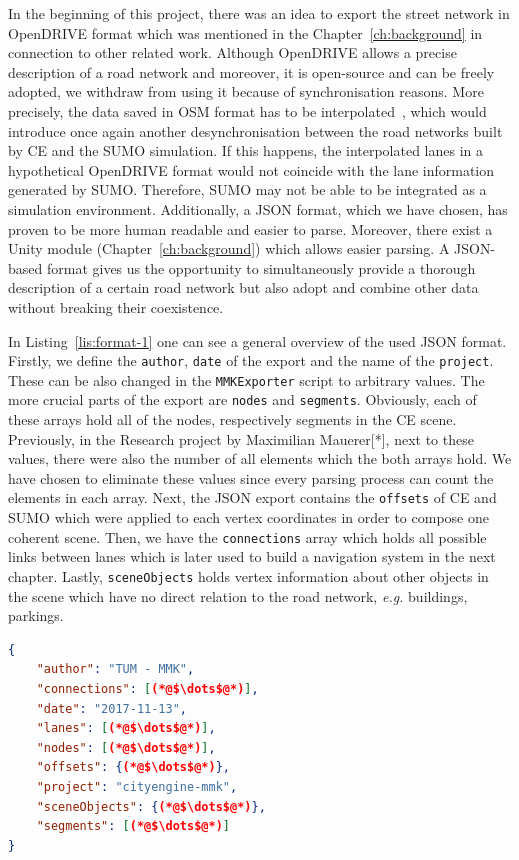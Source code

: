 In the beginning of this project, there was an idea to export the street network in OpenDRIVE format which was mentioned in the Chapter~\ref{ch:background} in connection to other related work. Although OpenDRIVE allows a precise description of a road network and moreover, it is open-source and can be freely adopted, we withdraw from using it because of synchronisation reasons. More precisely, the data saved in OSM format has to be interpolated~\cite{shi2011automatic}, which would introduce once again another desynchronisation between the road networks built by CE and the SUMO simulation. If this happens, the interpolated lanes in a hypothetical OpenDRIVE format would not coincide with the lane information generated by SUMO. Therefore, SUMO may not be able to be integrated as a simulation environment. Additionally, a JSON format, which we have chosen, has proven to be more human readable and easier to parse. Moreover, there exist a Unity module (Chapter~\ref{ch:background}) which allows easier parsing. A JSON-based format gives us the opportunity to simultaneously provide a thorough description of a certain road network but also adopt and combine other data without breaking their coexistence. 

In Listing~\ref{lis:format-1} one can see a general overview of the used JSON format. Firstly, we define the \texttt{author}, \texttt{date} of the export and the name of the \texttt{project}. These can be also changed in the \texttt{MMKExporter} script to arbitrary values. The more crucial parts of the export are \texttt{nodes} and \texttt{segments}. Obviously, each of these arrays hold all of the nodes, respectively segments in the CE scene. Previously, in the Research project by Maximilian Mauerer[*], next to these values, there were also the number of all elements which the both arrays hold. We have chosen to eliminate these values since every parsing process can count the elements in each array. Next, the JSON export contains the \texttt{offsets} of CE and SUMO which were applied to each vertex coordinates in order to compose one coherent scene. Then, we have the \texttt{connections} array which holds all possible links between lanes which is later used to build a navigation system in the next chapter. Lastly, \texttt{sceneObjects} holds vertex information about other objects in the scene which have no direct relation to the road network, \emph{e.g.} buildings, parkings.\\

    \begin{scriptsize}
	   \begin{lstlisting}[language=json,firstnumber=1,caption={General overview of the used JSON format for description of road networks.},label={lis:format-1}]
{
    "author": "TUM - MMK",
    "connections": [(*@$\dots$@*)],
    "date": "2017-11-13",
    "lanes": [(*@$\dots$@*)],
    "nodes": [(*@$\dots$@*)],
    "offsets": {(*@$\dots$@*)},
    "project": "cityengine-mmk",
    "sceneObjects": {(*@$\dots$@*)},
    "segments": [(*@$\dots$@*)]
}
	   \end{lstlisting}
    \end{scriptsize}

